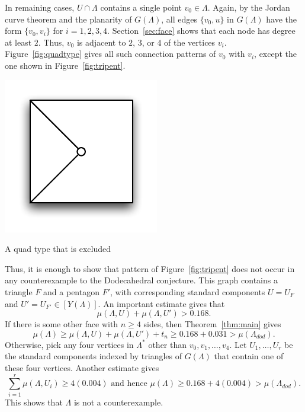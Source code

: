 \documentclass{article} %
\begin{document}
In remaining cases,  $U\cap\Lambda$ contains a single point $v_0\in\Lambda$.  Again, by
the Jordan curve theorem and the planarity of $G(\Lambda)$, 
all edges $\{v_0,u\}$ in $G(\Lambda)$ have the form
$\{v_0,v_i\}$ for $i=1,2,3,4$.  Section~\ref{sec:face} shows that each node has  degree
at least $2$.  Thus,  $v_0$ is adjacent to $2$, $3$, or $4$ of the vertices $v_i$.
Figure~\ref{fig:quadtype} gives all such connection patterns of $v_0$ with $v_i$, except
the one shown in Figure~\ref{fig:tripent}.  

\begin{Figure}[htb]
  \begin{center}
  \includegraphics[scale=0.50]{images/tripent.pdf}
  \end{center}
  \caption{A quad type that is excluded}
  \label{fig:tripent}
\end{Figure}

Thus, it is enough to show that pattern of Figure~\ref{fig:tripent} does not occur 
in any counterexample to the Dodecahedral conjecture.  This graph contains a triangle
$F$ and a pentagon $F'$, with corresponding standard components
$U=U_F$ and $U'=U_{F'}\in[Y(\Lambda)]$.
An important estimate \cite[Lemma~10.1]{Hales:2002:Dodec} gives that
$$
\mu(\Lambda,U) + \mu(\Lambda,U') > 0.168.
$$
If there is some other face  with $n\ge 4$ sides, then 
Theorem~\ref{thm:main} gives
$$
\mu(\Lambda) \ge \mu(\Lambda,U)+\mu(\Lambda,U') + t_n \ge 0.168 + 0.031 > \mu(\Lambda_{dod}).
$$
Otherwise, pick any four vertices in $\Lambda^*$ other than $v_0,v_1,\ldots,v_4$.  Let $U_1,\ldots,U_r$ be the standard components
indexed by triangles of $G(\Lambda)$
that contain one of these four vertices.  
Another estimate \cite[Lemma~5.2]{Hales:2002:Dodec} gives
$$
\sum_{i=1}^r \mu(\Lambda,U_i) \ge 4 (0.004) \text{ and hence }
\mu(\Lambda) \ge 0.168 + 4(0.004) > \mu(\Lambda_{dod}).
$$
This shows that $\Lambda$ is not a counterexample.
\end{document}
